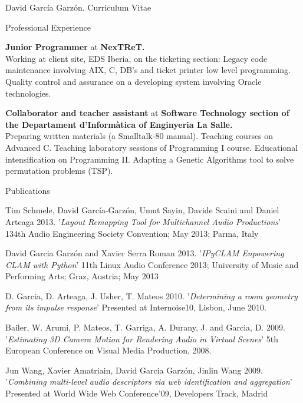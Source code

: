 \documentclass{article}
\begin{document}
\begin{cv}{David García Garzón. Curriculum Vitae}
\begin{cvlist}{Professional Experience}
\item[Jul 1997-Dec 1997]
{\bf Junior Programmer} at
{\bf NexTReT.}\\
Working at client site, EDS Iberia, on the ticketing section:
Legacy code maintenance involving AIX, C, DB’s and
ticket printer low level programming.
Quality control and assurance on a developing system involving Oracle technologies.


\item[Sep 1994-Jun 1997]
{\bf Collaborator and teacher assistant} at
{\bf Software Technology section of the Departament d'Informàtica of Enginyeria La Salle.}\\
Preparing written materials (a Smalltalk-80 manual).
Teaching courses on Advanced C.
Teaching laboratory sessions of Programming I course.
Educational intensification on Programming II.
Adapting a Genetic Algorithms tool to solve permutation problems (TSP).

	
\end{cvlist}

\begin{cvlist}{Publications}

\item[] {\sc Tim Schmele, David García-Garzón, Umut Sayin, Davide Scaini and Daniel Arteaga} 2013.
'{\em Layout Remapping Tool for Multichannel Audio Productions}'
134th Audio Engineering Society Convention; May 2013; Parma, Italy

\item[] {\sc David Garcia Garzón and Xavier Serra Roman} 2013.
'{\em IPyCLAM Enpowering CLAM with Python}'
11th Linux Audio Conference 2013; University of Music and Performing Arts; Graz, Austria; May 2013

\item[] {\sc D. Garcia, D. Arteaga,  J.  Usher, T. Mateos} 2010.
'{\em Determining a room geometry from its impulse response}'
Presented at Internoise10, Lisbon, June 2010.

\item[] {\sc Bailer, W. Arumi, P. Mateos, T. Garriga, A. Durany, J. and Garcia, D.} 2009.
'{\em Estimating 3D Camera Motion for Rendering Audio in Virtual Scenes}'
5th European Conference on Visual Media Production, 2008.

\item[] {\sc Jun Wang, Xavier Amatriain, David Garcia Garzón, Jinlin Wang} 2009.
'{\em Combining multi-level audio descriptors via web identification and aggregation}'
Presented at World Wide Web Conference'09, Developers Track, Madrid


\end{cvlist}
\end{cv}
\end{document}
